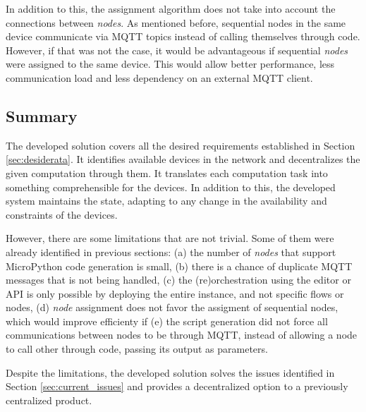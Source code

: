 In addition to this, the assignment algorithm does not take into account the connections between \textit{nodes}. As mentioned before, sequential nodes in the same device communicate via MQTT topics instead of calling themselves through code. However, if that was not the case, it would be advantageous if sequential \textit{nodes} were assigned to the same device. This would allow better performance, less communication load and less dependency on an external MQTT client.

\subsection{Summary}\label{sec:solution_summary}

The developed solution covers all the desired requirements established in Section \ref{sec:desiderata}. It identifies available devices in the network and decentralizes the given computation through them. It translates each computation task into something comprehensible for the devices. In addition to this, the developed system maintains the state, adapting to any change in the availability and constraints of the devices.

However, there are some limitations that are not trivial. Some of them were already identified in previous sections: (a) the number of \textit{nodes} that support MicroPython code generation is small, (b) there is a chance of duplicate MQTT messages that is not being handled, (c) the (re)orchestration using the editor or API is only possible by deploying the entire instance, and not specific flows or nodes, (d) \textit{node} assignment does not favor the assigment of sequential nodes, which would improve efficienty if (e) the script generation did not force all communications between nodes to be through MQTT, instead of allowing a node to call other through code, passing its output as parameters.

Despite the limitations, the developed solution solves the issues identified in Section \ref{sec:current_issues} and provides a decentralized option to a previously centralized product.